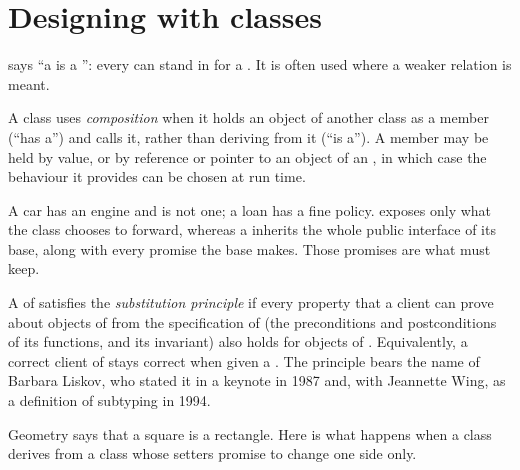 \section{Designing with classes}\label{sec:b2:cpp-polymorphism:design}

 says ``a  is a '': every  can stand in for a . It is often used where a
weaker relation is meant.

\begin{definition}[Composition]\label{def:b2:cpp-polymorphism:composition}
A class uses \emph{composition} when it holds an object of another class as a member (``has a'')
and calls it, rather than deriving from it (``is a''). A member may be held by value, or by reference or pointer to an
object of an , in which case the behaviour it provides can be chosen at run time.
\end{definition}

A car has an engine and is not one; a loan has a fine policy.  exposes only what the class chooses to
forward, whereas a  inherits the whole public interface of its base, along with every promise the base
makes. Those promises are what  must keep.

\begin{definition}\label{def:b2:cpp-polymorphism:lsp}
A   of  satisfies the \emph{substitution principle} if
every property that a client can prove about objects of  from the specification of  (the
preconditions and postconditions of its functions, and its invariant) also holds for objects of .
Equivalently, a correct client of  stays correct when given a . The principle bears the name of
Barbara Liskov, who stated it in a keynote in 1987 and, with Jeannette Wing, as a definition of subtyping in 1994.
\end{definition}

Geometry says that a square is a rectangle. Here is what happens when a class  derives from a class
 whose setters promise to change one side only.

